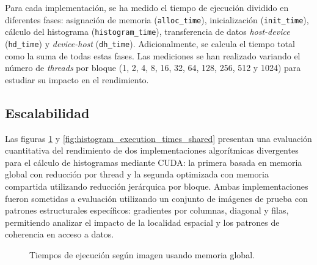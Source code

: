         Para cada implementación, se ha medido el tiempo de ejecución dividido en diferentes fases: asignación de memoria (\texttt{alloc\_time}), inicialización (\texttt{init\_time}), cálculo del histograma (\texttt{histogram\_time}), transferencia de datos \textit{host-device} (\texttt{hd\_time}) y \textit{ device-host} (\texttt{dh\_time}). Adicionalmente, se calcula el tiempo total como la suma de todas estas fases. Las mediciones se han realizado variando el número de \textit{threads} por bloque (1, 2, 4, 8, 16, 32, 64, 128, 256, 512 y 1024) para estudiar su impacto en el rendimiento.

    \subsection{Escalabilidad}
    
        Las figuras \ref{fig:histogram_execution_times_global} y \ref{fig:histogram_execution_times_shared} presentan una evaluación cuantitativa del rendimiento de dos implementaciones algorítmicas divergentes para el cálculo de histogramas mediante CUDA: la primera basada en memoria global con reducción por thread y la segunda optimizada con memoria compartida utilizando reducción jerárquica por bloque. Ambas implementaciones fueron sometidas a evaluación utilizando un conjunto de imágenes de prueba con patrones estructurales específicos: gradientes por columnas, diagonal y filas, permitiendo analizar el impacto de la localidad espacial y los patrones de coherencia en acceso a datos.
        
        \begin{figure}[H]
            \centering
            \caption{Tiempos de ejecución según imagen usando memoria global.}
            \label{fig:histogram_execution_times_global}
        \end{figure}
        
